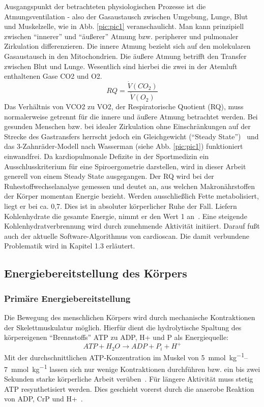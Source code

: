 Ausgangspunkt der betrachteten physiologischen Prozesse ist die Atmungsventilation - also der Gasaustausch zwischen Umgebung, Lunge, Blut und Muskelzelle, wie in Abb. \ref{pic:pic1} veranschaulicht. Man kann prinzipiell zwischen "`innerer"' und "`äußerer"' Atmung bzw. peripherer und pulmonaler Zirkulation differenzieren. Die innere Atmung bezieht sich auf den molekularen Gasaustausch in den Mitochondrien. Die äußere Atmung betrifft den Transfer zwischen Blut und Lunge. Wesentlich sind hierbei die zwei in der Atemluft enthaltenen Gase \ac{CO2} und \ac{O2}.
%
\begin{equation}
RQ = \frac{\dot{V}(CO_2)}{\dot{V}(O_2)}
\label{eq:formel1}
\end{equation}
%
Das Verhältnis von \ac{VCO2} zu \ac{VO2}, der Respiratorische Quotient (\acs{RQ}), muss normalerweise getrennt für die innere und äußere Atmung betrachtet werden. Bei gesunden Menschen bzw. bei idealer Zirkulation ohne Einschränkungen auf der Strecke des Gastransfers herrscht jedoch ein Gleichgewicht ("`Steady State"')~\cite{Kroidl.2015} und das 3-Zahnräder-Modell nach Wasserman (siehe Abb. \ref{pic:pic1}) funktioniert einwandfrei. Da kardiopulmonale Defizite in der Sportmedizin ein Ausschlusskriterium für eine Spiroergometrie darstellen, wird in dieser Arbeit generell von einem Steady State ausgegangen. Der RQ wird bei der Ruhestoffwechselanalyse gemessen und deutet an, aus welchen Makronährstoffen der Körper momentan Energie bezieht. Werden ausschließlich Fette metabolisiert, liegt er bei ca. 0,7. Dies ist in absoluter körperlicher Ruhe der Fall. Liefern Kohlenhydrate die gesamte Energie, nimmt er den Wert 1 an~\cite{Kroidl.2015}. Eine steigende Kohlenhydratverbrennung wird durch zunehmende Aktivität initiiert. Darauf fußt auch der aktuelle Software-Algorithmus von cardioscan. Die damit verbundene Problematik wird in Kapitel 1.3 erläutert.

\subsection{Energiebereitstellung des Körpers}

\subsubsection{Primäre Energiebereitstellung}

Die Bewegung des menschlichen Körpers wird durch mechanische Kontraktionen der Skelettmuskulatur möglich. Hierfür dient die hydrolytische Spaltung des körpereigenen "`Brennstoffs"' \ac{ATP} zu \ac{ADP}, \ac{H+} und \ac{P} als Energiequelle:
%
\begin{equation}
ATP + H_2O \rightarrow ADP + P_i + H^+
\label{eq:formel2}
\end{equation}
%
Mit der durchschnittlichen \acs{ATP}-Konzentration im Muskel von \SIrange{5}{7}{\milli\mole\per\kg} lassen sich nur wenige Kontraktionen durchführen bzw. ein bis zwei Sekunden starke körperliche Arbeit verüben~\cite{DeMarees.1981}. Für längere Aktivität muss stetig \acs{ATP} resynthetisiert werden. Dies geschieht vorerst durch die anaerobe Reaktion von \acs{ADP}, \ac{CrP} und \acs{H+}~\cite{Heck.2006}.

